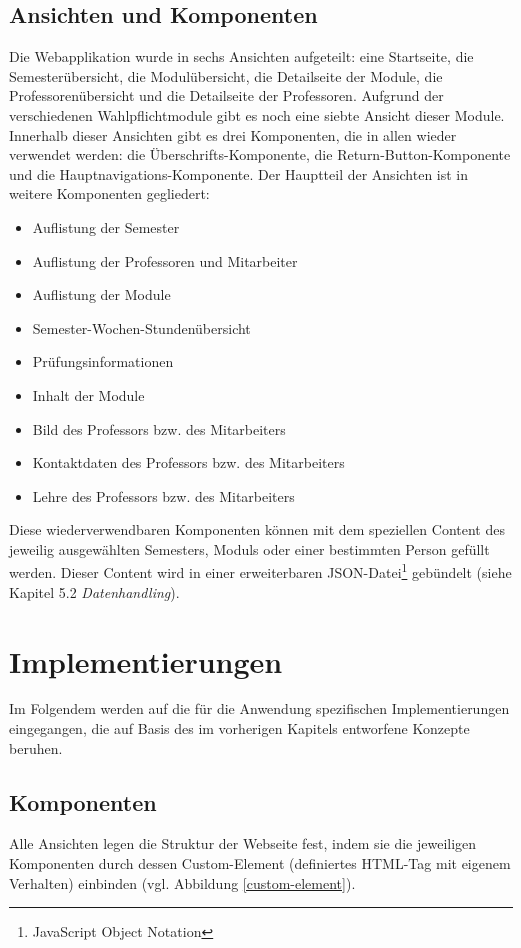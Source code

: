 \documentclass[12pt,					%
							 oneside,			%
							 a4paper,			%
							 halfparskip,		%
							 liststotoc,			%
							 bibtotoc,			%
							 fleqn,				%
							 pointlessnumbers]	%
							 {scrreprt}
\begin{document}
		\section{Ansichten und Komponenten}	
		 Die Webapplikation wurde in sechs Ansichten aufgeteilt: eine Startseite, die Semesterübersicht, die Modulübersicht, die Detailseite der Module, die Professorenübersicht und die Detailseite der Professoren. Aufgrund der verschiedenen Wahlpflichtmodule gibt es noch eine siebte Ansicht dieser Module. Innerhalb dieser Ansichten gibt es drei Komponenten, die in allen wieder verwendet werden: die Überschrifts-Komponente, die Return-Button-Komponente und die Hauptnavigations-Komponente. Der Hauptteil der Ansichten ist in weitere Komponenten gegliedert:
	\begin{itemize}
		\item Auflistung der Semester
		\item Auflistung der Professoren und Mitarbeiter
		\item Auflistung der Module
		\item Semester-Wochen-Stundenübersicht
		\item Prüfungsinformationen
		\item Inhalt der Module
		\item Bild des Professors bzw. des Mitarbeiters
		\item Kontaktdaten des Professors bzw. des Mitarbeiters
		\item Lehre des Professors bzw. des Mitarbeiters
	\end{itemize}	
Diese wiederverwendbaren Komponenten können mit dem speziellen Content des jeweilig ausgewählten Semesters, Moduls oder einer bestimmten Person gefüllt werden. Dieser Content wird in einer erweiterbaren JSON-Datei\footnote{\label{foot:1}JavaScript Object Notation} gebündelt (siehe Kapitel 5.2 \textit{Datenhandling}).



\chapter{Implementierungen}  
Im Folgendem werden auf die für die Anwendung spezifischen Implementierungen eingegangen, die auf Basis des im vorherigen Kapitels entworfene Konzepte beruhen.

	\section{Komponenten}
	Alle Ansichten legen die Struktur der Webseite fest, indem sie die jeweiligen Komponenten durch dessen Custom-Element (definiertes HTML-Tag mit eigenem Verhalten) einbinden  (vgl. Abbildung \ref{custom-element}). 
	
\end{document}
